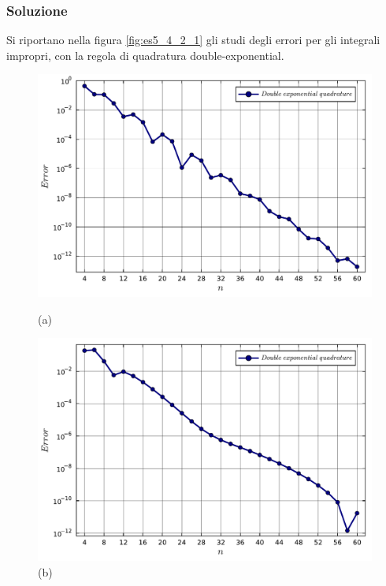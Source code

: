 \documentclass[letterpaper, 12pt]{article}
\numberwithin{equation}{section}    %
\begin{document}
\subsubsection{Soluzione}
Si riportano nella figura \ref{fig:es5_4_2_1}  gli studi degli errori per gli integrali 
impropri, con la regola di quadratura double-exponential.
\begin{figure}[!ht]
    \centering
    \begin{minipage}[b]{0.47\textwidth}
        \includegraphics[width=\textwidth]{5421.pdf}
        \caption*{(a)}
    \end{minipage}
    \hspace{0.5cm}
    \begin{minipage}[b]{0.47\textwidth}
        \includegraphics[width=\textwidth]{5422.pdf}
        \caption*{(b)}
    \end{minipage}
    \begin{minipage}[b]{0.47\textwidth}

\end{minipage}
\end{figure}
\end{document}
